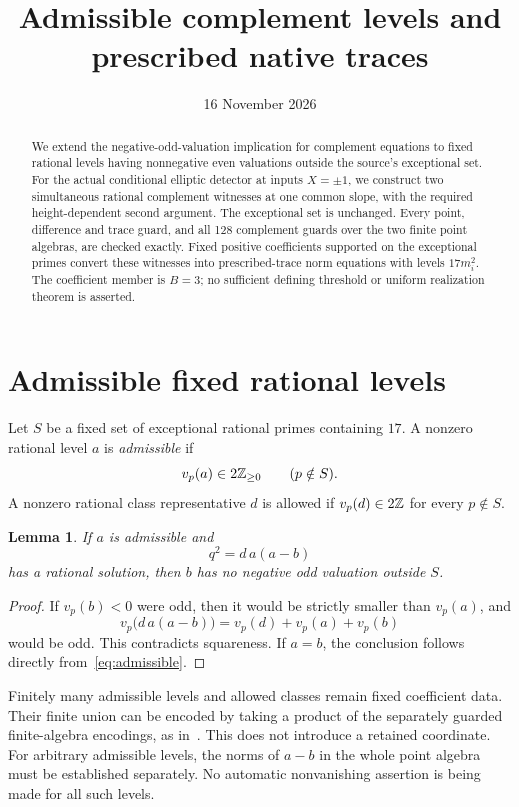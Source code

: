 \documentclass[11pt,a4paper]{article}
\title{Admissible complement levels and prescribed native traces}
\author{}\date{16 November 2026}
\newtheorem{lemma}[theorem]{Lemma}
\begin{document}
\maketitle
\begin{abstract}
We extend the negative-odd-valuation implication for complement equations
to fixed rational levels having nonnegative even valuations outside the
source's exceptional set. For the actual conditional elliptic detector
at inputs $X=\pm1$, we construct two simultaneous rational complement
witnesses at one common slope, with the required height-dependent second
argument. The exceptional set is unchanged. Every point, difference and
trace guard, and all 128 complement guards over the two finite point
algebras, are checked exactly. Fixed positive coefficients supported on
the exceptional primes convert these witnesses into prescribed-trace
norm equations with levels $17m_i^2$. The coefficient member is $B=3$;
no sufficient defining threshold or uniform realization theorem is
asserted.
\end{abstract}

\section{Admissible fixed rational levels}

Let $S$ be a fixed set of exceptional rational primes containing $17$.
A nonzero rational level $a$ is \emph{admissible} if
\begin{equation}\label{eq:admissible}
             v_p(a)\in2\mathbb Z_{\ge0}\qquad(p\notin S).
\end{equation}
A nonzero rational class representative $d$ is allowed if
$v_p(d)\in2\mathbb Z$ for every $p\notin S$.

\begin{lemma}\label{lem:local}
If $a$ is admissible and
\[
                         q^2=d\,a(a-b)
\]
has a rational solution, then $b$ has no negative odd valuation outside
$S$.
\end{lemma}
\begin{proof}
If $v_p(b)<0$ were odd, then it would be strictly smaller than
$v_p(a)$, and
\[
 v_p\bigl(d\,a(a-b)\bigr)=v_p(d)+v_p(a)+v_p(b)
\]
would be odd. This contradicts squareness. If $a=b$, the conclusion
follows directly from~\eqref{eq:admissible}.
\end{proof}

Finitely many admissible levels and allowed classes remain fixed
coefficient data. Their finite union can be encoded by taking a product
of the separately guarded finite-algebra encodings, as
in~\cite{FiniteClasses}. This does not introduce a retained coordinate.
For arbitrary admissible levels, the norms of $a-b$ in the whole point
algebra must be established separately. No automatic nonvanishing
assertion is being made for all such levels.
\end{document}
